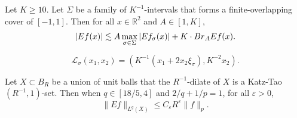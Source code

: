 \documentclass[10pt,a4paper]{amsart}
\newcommand{\BR}{{\rm{Br}}}
\newcommand{\Si}{\Sigma}
\newcommand{\ZR}{\mathbb{R}}
\newcommand{\cl}{\mathcal L}
\newcommand{\e}{\varepsilon}
\newcommand{\si}{\sigma}
\begin{document}
\begin{lemma}
	\label{broad-narrow-lem}
	Let $K\geq10$.
	Let $\Si$ be a family of $K^{-1}$-intervals that forms a finite-overlapping cover of $[-1,1]$.
	Then for all $x\in\ZR^2$ and $A\in[1,K]$,  
	\begin{align}
	\label{broad-narrow}
		|Ef(x)|\lesssim A\max_{\si\in\Si}|Ef_{\si}(x)|+K\cdot \BR_AEf(x).
	\end{align}
\end{lemma}

\begin{equation}
\label{parabolic-rescaling}
    \cl_\si(x_1,x_2)=(K^{-1}(x_1+2x_2\xi_\si), K^{-2}x_2).
\end{equation}

\begin{proposition}
\label{weighted-lp-prop}
Let $X\subset B_R$ be a union of unit balls that the $R^{-1}$-dilate of $X$ is a Katz-Tao $(R^{-1},1)$-set.
Then when $q\in[18/5,4]$ and $2/q+1/p=1$, for all $\e>0$,
\begin{equation}
\label{weighted-lp-esti}
    \|Ef\|_{L^q(X)}\leq C_\e R^\e\|f\|_p.
\end{equation}
\end{proposition}
\end{document}
